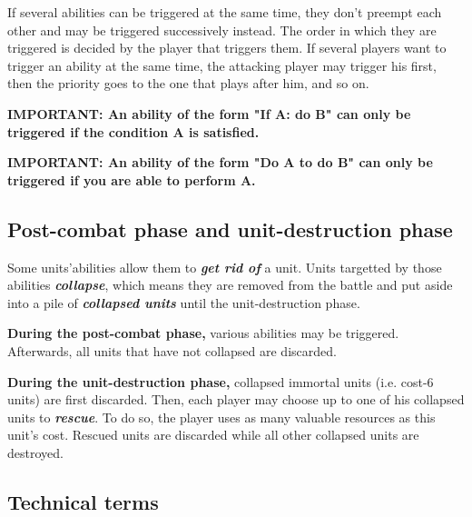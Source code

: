\documentclass[a4paper]{article}
\begin{document}
    If several abilities can be triggered at the same time,
    they don't preempt each other and may be triggered successively instead.
    The order in which they are triggered is decided by the player that triggers them.
    If several players want to trigger an ability at the same time,
    the attacking player may trigger his first,
    then the priority goes to the one that plays after him, and so on.
    
    \hspace{-2em} \textbf{
    IMPORTANT: An ability of the form "\textbf{If} A\textbf{:} do B" can only be
    triggered if the condition A is satisfied.
    }
    
    \hspace{-2em} \textbf{
    IMPORTANT: An ability of the form "Do A \textbf{to} do B" can only be triggered
    if you are able to perform A.
    }
    

\newpage
  \subsection{Post-combat phase and unit-destruction phase}
    
    Some units'abilities allow them to \textbf{\textit{get rid of}} a unit.
    Units targetted by those abilities \textbf{\textit{collapse}},
    which means they are removed from the battle and put aside into a pile
    of \textbf{\textit{collapsed units}} until the unit-destruction phase.
    
    \textbf{During the post-combat phase,} various abilities may be triggered.
    Afterwards, all units that have not collapsed are discarded.
    
    \textbf{During the unit-destruction phase,} collapsed immortal units
    (i.e. cost-6 units) are first discarded.
    Then, each player may choose up to one of his collapsed units to
    \textbf{\textit{rescue}}.
    To do so, the player uses as many valuable resources as this unit's cost.
    Rescued units are discarded while all other collapsed units are destroyed.
    

  \subsection{Technical terms}
  
\end{document}
